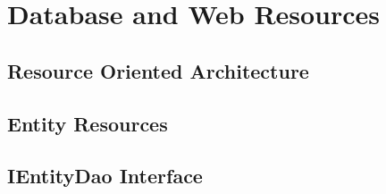 \chapter{Database and Web Resources}\label{ch01:04}

\section{Resource Oriented Architecture}

\section{Entity Resources}

\section{IEntityDao Interface}